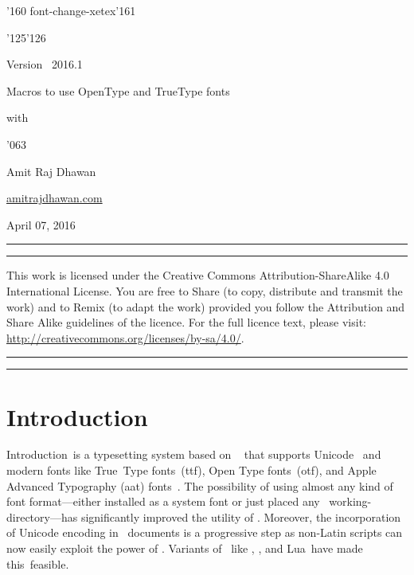 {}
{\centerline{{\color{brown}\webomints\char'160}\hskip8mm\titlefont\color{sectioncolor} font-change-xetex\hskip8mm{\color{brown}\webomints\char'161}}\bs
\centerline{{\color{brown}\webomints\char'125\char'126}}
\bs
\centerline{Version \ 2016.1}
\bs\bs
{\color{sectioncolor}\fourteenbf\fontss\centerline{Macros to use OpenType and TrueType  fonts}\kern3mm
\centerline{with \XeTeX}}

\vskip2cm
\centerline{\color{brown}\webomints \char'063}
\vskip2cm
\centerline{\twelvebf\fontss Amit Raj Dhawan}\sk
\centerline{\href{mailto:amitrajdhawan@gmail.com}{\sansrm amitrajdhawan\@gmail.com}}\sk
\centerline{\rm April 07, 2016}

\vskip7cm

\hrule\kern1pt\hrule\sk
{}
\vskip-7mm
\vbox{\parindent=0pt\eightrm\fontss\ii  This work is licensed under the Creative Commons Attribution-ShareAlike 4.0 International License. You are free to {\eightitbf Share\/} (to copy, distribute and transmit the work) and to {\eightitbf Remix\/} (to adapt the work) provided you follow the {\eightitbf Attribution\/} and {\eightitbf Share Alike\/} guidelines of the licence. For the full licence text, please visit:
\href{http://creativecommons.org/licenses/by-sa/4.0/}{\eightrm http://creativecommons.org/licenses/by-sa/4.0/}.}
\sk\hrule\kern1pt\hrule

\BlackBoxes


\newpage

\bs\ms
{}%

\readtocfile

\footline{\cl{\folio}}


\newpage
{}
\footline{}

\section{Introduction}{Introduction}\capsxetex\ is a typesetting system based on \capstex~\cite{xetex_package} that supports Unicode~\cite{unicode_webpage} and modern fonts like True~Type fonts~({\caps ttf}), Open Type fonts~({\caps otf}), and Apple Advanced Typography ({\caps aat}) fonts~\cite{phinney_2001_ttf_otf}. The possibility of using almost any kind of font format---either installed as a system font or just placed any \capstex\ working-directory---has significantly improved the utility of \capstex. Moreover, the incorporation of Unicode encoding in \capstex\ documents is a progressive step as non-Latin scripts can now easily exploit the power of \capstex. Variants of \capstex\ like \capsxetex, \capsxelatex, and Lua\capstex\ have made this~feasible.



}
